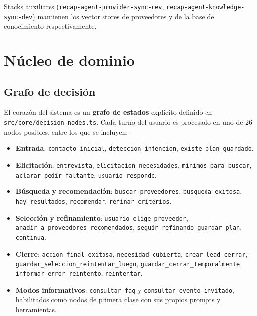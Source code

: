 \documentclass[11pt,a4paper]{article}
\begin{document}
Stacks auxiliares (\texttt{recap-agent-provider-sync-dev},
\texttt{recap-agent-knowledge-sync-dev}) mantienen los vector stores de
proveedores y de la base de conocimiento respectivamente.

\section{Núcleo de dominio}

\subsection{Grafo de decisión}

El corazón del sistema es un \textbf{grafo de estados} explícito definido en
\texttt{src/core/decision-nodes.ts}. Cada turno del usuario es procesado en
uno de 26 nodos posibles, entre los que se incluyen:

\begin{itemize}[leftmargin=*,itemsep=1pt]
  \item \textbf{Entrada}: \texttt{contacto\_inicial}, \texttt{deteccion\_intencion},
        \texttt{existe\_plan\_guardado}.
  \item \textbf{Elicitación}: \texttt{entrevista}, \texttt{elicitacion\_necesidades},
        \texttt{minimos\_para\_buscar}, \texttt{aclarar\_pedir\_faltante},
        \texttt{usuario\_responde}.
  \item \textbf{Búsqueda y recomendación}: \texttt{buscar\_proveedores},
        \texttt{busqueda\_exitosa}, \texttt{hay\_resultados},
        \texttt{recomendar}, \texttt{refinar\_criterios}.
  \item \textbf{Selección y refinamiento}: \texttt{usuario\_elige\_proveedor},
        \texttt{anadir\_a\_proveedores\_recomendados},
        \texttt{seguir\_refinando\_guardar\_plan}, \texttt{continua}.
  \item \textbf{Cierre}: \texttt{accion\_final\_exitosa},
        \texttt{necesidad\_cubierta}, \texttt{crear\_lead\_cerrar},
        \texttt{guardar\_seleccion\_reintentar\_luego},
        \texttt{guardar\_cerrar\_temporalmente},
        \texttt{informar\_error\_reintento}, \texttt{reintentar}.
  \item \textbf{Modos informativos}: \texttt{consultar\_faq} y
        \texttt{consultar\_evento\_invitado}, habilitados como nodos de
        primera clase con sus propios prompts y herramientas.
\end{itemize}
\end{document}
